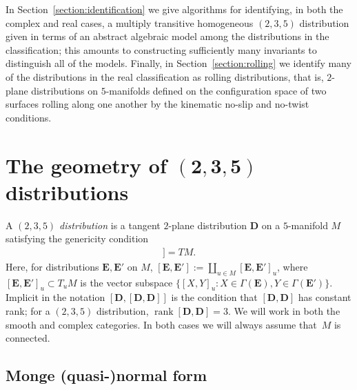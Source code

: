 \documentclass[10pt,a4paper]{amsart}
\DeclareMathOperator{\rank}{rank}
\newcommand{\mbD}{\mathbf{D}}
\newcommand{\mbE}{\mathbf{E}}
\numberwithin{equation}{section}
\begin{document}
In Section~\ref{section:identification} we give algorithms for identifying, in both the complex and real cases, a multiply transitive homogeneous $(2, 3, 5)$ distribution given in terms of an abstract algebraic model among the distributions in the classification; this amounts to constructing sufficiently many invariants to distinguish all of the models. Finally, in Section~\ref{section:rolling} we identify many of the distributions in the real classification as rolling distributions, that is, $2$-plane distributions on $5$-manifolds defined on the configuration space of two surfaces rolling along one another by the kinematic no-slip and no-twist conditions.

\section[The geometry of $(2,3,5)$ distributions]{The geometry of $\boldsymbol{(2,3,5)}$ distributions}

A \textit{$(2, 3, 5)$ distribution} is a tangent $2$-plane distribution $\mbD$ on a $5$-manifold $M$ satisfying the genericity condition
\begin{gather*}
	[\mbD, [\mbD, \mbD]] = TM .
\end{gather*}
Here, for distributions $\mbE, \mbE'$ on $M$, $[\mbE, \mbE'] := \coprod_{u \in M} [\mbE, \mbE']_u$, where $[\mbE, \mbE']_u \subset T_u M$ is the vector subspace $\{[X, Y]_u \colon X \in \Gamma(\mbE), Y \in \Gamma(\mbE')\}$. Implicit in the notation $[\mbD, [\mbD, \mbD]]$ is the condition that $[\mbD, \mbD]$ has constant rank; for a $(2, 3, 5)$ distribution, $\rank{}[\mbD, \mbD] = 3$. We will work in both the smooth and complex categories. In both cases we will always assume that~$M$ is connected.

\subsection{Monge (quasi-)normal form}
\end{document}
